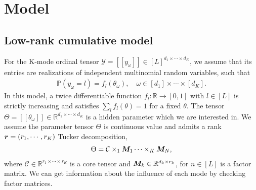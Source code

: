 \documentclass{article}
\theoremstyle{plain}
\theoremstyle{definition}
\begin{document}
\section{Model}
\subsection{Low-rank cumulative model}
For the K-mode ordinal tensor $\mathcal{Y} = [\![ y_\omega]\!]\in[L]^{d_1\times\cdots\times d_K}$, we assume that its entries are realizations of independent multinomial random variables, such that
\begin{equation}
    \begin{aligned}
        \label{mainmodel}
        \mathbb{P}(y_\omega=l) = f_l(\theta_\omega), \quad \omega\in [d_1]\times\cdots\times[d_K].
    \end{aligned}
\end{equation}
In this model, a twice differentiable function $f_l : \mathbb{R}\rightarrow [0,1]$ with $l\in [L]$ is strictly increasing and satisfies $\sum_l f_l(\theta) = 1$ for a fixed $\theta$.
The tensor $\Theta = [\![\theta_\omega]\!]\in \mathbb{R}^{d_1\times\cdots\times d_K}$
is a hidden parameter which we are interested in. We assume the parameter tensor $\Theta$ is continuous value and admits a rank $\bm{r} = (r_1,\cdots,r_K)$ Tucker decomposition,
\begin{equation}
    \begin{aligned}
        \label{tucker}
        \Theta = \mathcal{C}\times_1\bm M_1\cdots\times_K\bm M_N,
    \end{aligned}
\end{equation}
where $\mathcal{C}\in \mathbb{R}^{r_1\times\cdots\times r_K}$ is a core tensor and $\bm M_k\in \mathbb{R}^{d_k\times r_k}$, for $n \in [L]$ is a factor matrix. We can get information about the influence of each mode by checking factor matrices.
\end{document}
